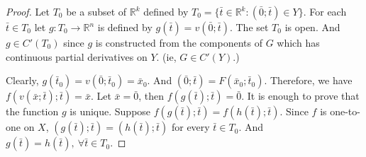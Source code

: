 \begin{proof}
	Let $T_0$ be a subset of $\mathbb{R}^k$ defined by $T_0 = \{ \bar{t} \in \mathbb{R}^k : (\bar{0};\bar{t}) \in Y \}$.
	For each $\bar{t} \in T_0$ let $g : T_0 \to \mathbb{R}^n$ is defined by $g(\bar{t}) = v(\bar{0};\bar{t})$.
	The set $T_0$ is open.
	And $g \in C'(T_0)$ since $g$ is constructed from the components of $G$ which has continuous partial derivatives on $Y$.
	(ie, $G \in C'(Y)$.)

	Clearly, $g(\bar{t}_0) = v(\bar{0};\bar{t}_0) = \bar{x}_0$.
	And $(\bar{0};\bar{t}) = F(\bar{x}_0;\bar{t}_0)$.
	Therefore, we have $f(v(\bar{x};\bar{t});\bar{t}) = \bar{x}$.
	Let $\bar{x} = \bar{0}$, then $f(g(\bar{t});\bar{t}) = \bar{0}$.
	It is enough to prove that the function $g$ is unique.
	Suppose $f(g(\bar{t});\bar{t}) = f(h(\bar{t});\bar{t})$.
	Since $f$ is one-to-one on $X$, $(g(\bar{t});\bar{t}) = (h(\bar{t});\bar{t})$ for every $\bar{t} \in T_0$.
	And $g(\bar{t}) = h(\bar{t}),\ \forall \bar{t} \in T_0$.
\end{proof}

